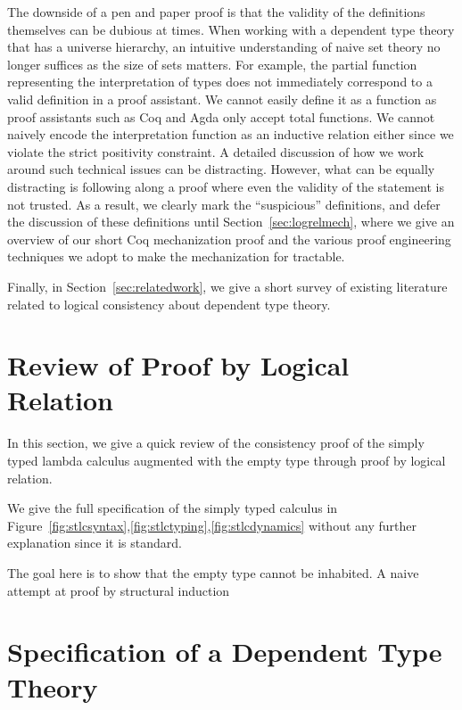 \documentclass[nonacm]{acmart}
\begin{document}
The downside of a pen and paper proof is that the validity of the
definitions themselves can be dubious at times. When working with a
dependent type theory that has a universe hierarchy, an intuitive
understanding of naive set theory no longer suffices as the size of
sets matters. For example, the partial function representing the
interpretation of types does not immediately correspond to a valid
definition in a proof assistant. We cannot easily define it as a
function as proof assistants such as Coq and Agda only accept total
functions. We cannot naively encode the interpretation function as an
inductive relation either since we violate the strict positivity
constraint. A detailed discussion of how we work around such technical
issues can be distracting. However, what can be equally distracting is
following along a proof where even the validity of the statement is
not trusted. As a result, we clearly mark the ``suspicious''
definitions, and defer the discussion of these definitions
until Section~\ref{sec:logrelmech}, where we give an overview of our
short Coq mechanization proof and the various proof engineering
techniques we adopt to make the mechanization for tractable.

Finally, in Section~\ref{sec:relatedwork}, we give a short survey of
existing literature related to logical consistency about dependent
type theory.

\section{Review of Proof by Logical Relation}
\label{sec:logrelstlc}
In this section, we give a quick review of the consistency proof of the
simply typed lambda calculus augmented with the empty type through
proof by logical relation.

We give the full specification of the simply typed calculus in
Figure~\ref{fig:stlcsyntax},\ref{fig:stlctyping},\ref{fig:stlcdynamics}
without any further explanation since it is standard.

The goal here is to show that the empty type cannot be
inhabited. A naive attempt at proof by structural induction


\section{Specification of a Dependent Type Theory}
\label{sec:spec}
\end{document}

